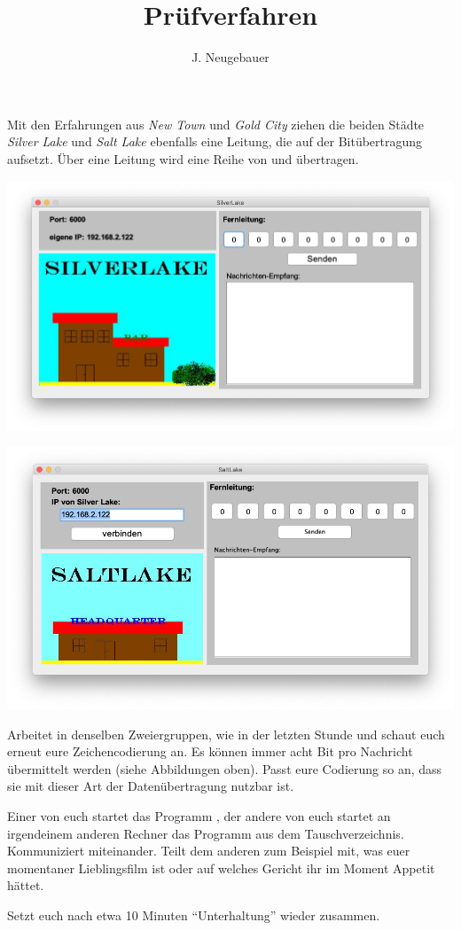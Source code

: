 \documentclass[10pt, a4paper]{scrartcl}
\author{J. Neugebauer}
\title{Prüfverfahren}
\date{\Heute}
\begin{document}
\ReiheTitel

Mit den Erfahrungen aus \emph{New Town} und \emph{Gold City} ziehen die beiden Städte \emph{Silver Lake} und \emph{Salt Lake} ebenfalls eine Leitung, die auf der Bitübertragung aufsetzt. Über eine Leitung wird eine Reihe von  und  übertragen.

\begin{multicols}{2}\centering	
	\includegraphics[width=.9\columnwidth]{Q2-GK-AB.II.2-Abb_Silver Lake.png}

	\includegraphics[width=.9\columnwidth]{Q2-GK-AB.II.2-Abb_Saltlake.png}
\end{multicols}

\begin{aufgabe}
	Arbeitet in denselben Zweiergruppen, wie in der letzten Stunde und schaut euch erneut eure Zeichencodierung an. Es können immer acht Bit pro Nachricht übermittelt werden (siehe Abbildungen oben). Passt eure Codierung so an, dass sie mit dieser Art der Datenübertragung nutzbar ist.
\end{aufgabe}

\begin{aufgabe}
	Einer von euch startet das Programm , der andere von euch startet an irgendeinem anderen Rechner das Programm  aus dem Tauschverzeichnis. Kommuniziert miteinander. Teilt dem anderen zum Beispiel mit, was euer momentaner Lieblingsfilm ist oder auf welches Gericht ihr im Moment Appetit hättet.
	
	Setzt euch nach etwa 10 Minuten \enquote{Unterhaltung} wieder zusammen.
\end{aufgabe}
\end{document}
